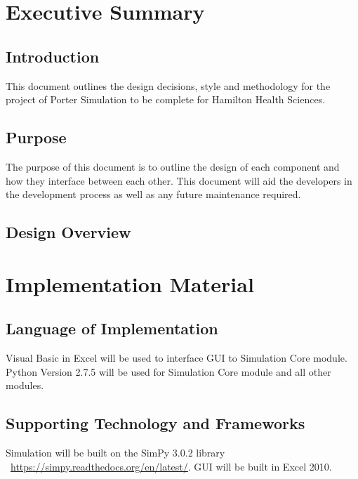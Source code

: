 \documentclass[paper=letter, fontsize=10pt]{scrartcl}
\numberwithin{equation}{section}		%
\numberwithin{figure}{section}			%
\numberwithin{table}{section}				%
\begin{document}
\section{Executive Summary}
\subsection{Introduction}
This document outlines the design decisions, style and methodology for the project of Porter Simulation to be complete for Hamilton Health Sciences.
\subsection{Purpose}
The purpose of this document is to outline the design of each component and how they interface between each other. This document will aid the developers in the development process as well as any future maintenance required.
\subsection{Design Overview}
\section{Implementation Material}
\subsection{Language of Implementation}
Visual Basic in Excel will be used to interface GUI to Simulation Core module. Python Version 2.7.5 will be used for Simulation Core module and all other modules.
\subsection{Supporting Technology and Frameworks}
Simulation will be built on the SimPy 3.0.2 library \ \underline{\url{https://simpy.readthedocs.org/en/latest/}}. GUI will be built in Excel 2010. 
\newpage
\end{document}
